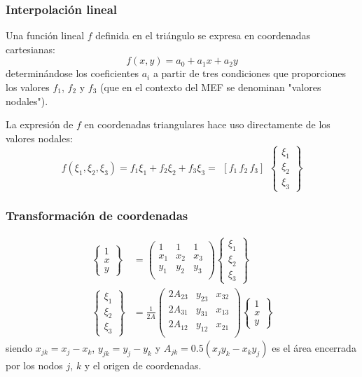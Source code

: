 \documentclass{beamer}
\begin{document}
\begin{frame}
\frametitle{Interpolación lineal}
Una función lineal $f$ definida en el triángulo se expresa en coordenadas
cartesianas:
\begin{equation}
f(x,y)=a_0+a_1 x + a_2 y
\end{equation}
determinándose los coeficientes $a_i$ a partir de tres condiciones que
proporciones los valores $f_1$, $f_2$ y $f_3$ (que en el contexto del MEF se 
denominan "valores nodales").

La expresión de $f$ en coordenadas triangulares hace uso directamente de los
valores nodales:
\begin{equation}
f(\xi_1,\xi_2,\xi_3)=f_1 \xi_1+f_2 \xi_2+f_3 \xi_3=
\begin{array}{ccc}
\left[ f_1 \, f_2 \, f_3 \right]
\end{array}
\left\{ 
\begin{array}{c}
\xi_1 \\
\xi_2 \\
\xi_3 
\end{array}
\right\}
\end{equation}
\end{frame}
\begin{frame}
\frametitle{Transformación de coordenadas}
\begin{align}
\left\{
\begin{array}{c}
1 \\
x \\
y
\end{array}
\right\}
&=
\left(
\begin{array}{ccc}
1   & 1   & 1   \\
x_1 & x_2 & x_3 \\
y_1 & y_2 & y_3 \\
\end{array}
\right)
\left\{
\begin{array}{c}
\xi_1 \\
\xi_2 \\
\xi_3
\end{array}
\right\} \label{cstxxi} \\
\left\{
\begin{array}{c}
\xi_1 \\
\xi_2 \\
\xi_3
\end{array}
\right\}
&=\frac{1}{2A}
\left(
\begin{array}{ccc}
2A_{23} & y_{23} & x_{32} \\
2A_{31} & y_{31} & x_{13} \\
2A_{12} & y_{12} & x_{21} \\
\end{array}
\right)
\left\{
\begin{array}{c}
1 \\
x \\
y
\end{array}
\right\} \label{cstxix}
\end{align}
siendo $x_{jk}=x_j-x_k$, $y_{jk}=y_j-y_k$ y $A_{jk}=0.5(x_jy_k-x_ky_j)$ es el 
área encerrada por los nodos $j$, $k$ y el origen de coordenadas.
\end{frame}
\end{document}
